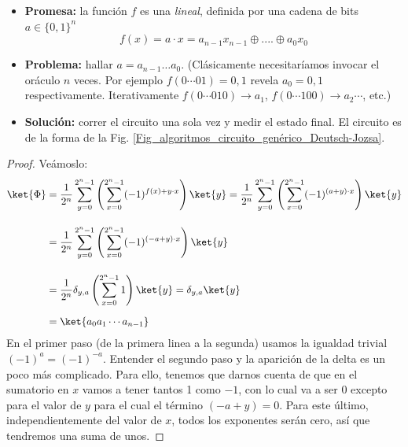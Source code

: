\documentclass[a4paper,11pt]{book} %
\numberwithin{equation}{chapter}
\def\lp{\left(}
\def\rp{\right)}
\begin{document}
\begin{itemize}
	\item \textbf{Promesa:} la función $f$ es una \textit{lineal}, definida por una cadena de bits $a \in \{0,1\}^n$
		\begin{equation*}
		f(x) = a\cdot x  = a_{n-1} x_{n-1} \oplus ....\oplus a_0 x_0
		\end{equation*}

	
	\item \textbf{Problema:} hallar $a = a_{n-1} \ldots a_0$. (Clásicamente necesitaríamos invocar el oráculo  $n$ veces. Por ejemplo  $f(0\cdots 0 1)=0,1 $ revela $a_0=0,1$ respectivamente. Iterativamente  $f(0\cdots 0 1 0)\to a_1$, $ f(0\cdots 1 0 0)\to a_2 \cdots$, etc.)
	
	\item \textbf{Solución:} correr el circuito una sola vez y medir el estado final. 	El circuito es de la forma de la Fig. \ref{Fig_algoritmos_circuito_genérico_Deutsch-Jozsa}.
\end{itemize}

	\begin{proof}
	Veámoslo:
	\begin{align*}
	\ket{\Phi} & = \frac{1}{2^n}\sum_{y=0}^{2^n-1} \left(\sum_{x=0}^{2^n-1}(-1)^{f(x)+ y\cdot x}\right)\ket{y} = \frac{1}{2^n}\sum_{y=0}^{2^n-1} \left(\sum_{x=0}^{2^n-1}(-1)^{(a+y)\cdot x}\right)\ket{y} \\  \rule{0mm}{10mm}
	& =  \frac{1}{2^n}\sum_{y=0}^{2^n-1} \left(\sum_{x=0}^{2^n-1}(-1)^{(-a+y)\cdot x}\right)\ket{y} \\ \rule{0mm}{10mm}
	& =  \frac{1}{2^n} \delta_{y,a} \lp \sum_{x=0}^{2^n-1} 1 \rp \ket{y} = \delta_{y,a} \ket{y} \\  \rule{0mm}{5mm} 
    & =  \ket{a_0a_1\cdots a_{n-1}}
	\end{align*}
	En el primer paso (de la primera linea a la segunda) usamos la igualdad trivial $ (-1)^a = (-1)^{-a}$. Entender el segundo paso y la aparición de la  delta es un poco más complicado. Para ello, tenemos que darnos cuenta de que en el sumatorio en $x$ vamos a tener tantos 1 como $-1$, con lo cual va a ser $0$ excepto para el valor de $y$ para el cual el término $(-a+y) = 0$. Para este último, independientemente del valor de $x$, todos los exponentes serán cero, así que tendremos una suma de unos.
	\end{proof}
\end{document}
